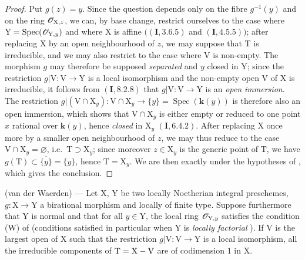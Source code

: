 \begin{proof}
Put $g(z)=y$. Since the question depends only on the fibre $g^{-1}(y)$ and on the ring $\mathscr{O}_{\mathrm{X},z}$, we can, by base change, restrict ourselves to the case where $\mathrm{Y}=\operatorname{Spec}(\mathscr{O}_{\mathrm{Y},y})$ and where $\mathrm{X}$ is affine $((\mathbf I,3.6.5)$ and $(\mathbf I,4.5.5))$; after replacing $\mathrm{X}$ by an open neighbourhood of $z$, we may suppose that $\mathrm{T}$ is irreducible, and we may also restrict to the case where $\mathrm{V}$ is non-empty.
The morphism $g$ may therefore be supposed \emph{separated} and $y$ closed in $\mathrm{Y}$; since the restriction $g|\mathrm{V}:\mathrm{V}\to\mathrm{Y}$ is a local isomorphism and the non-empty open $\mathrm{V}$ of $\mathrm{X}$ is irreducible, it follows from $(\mathbf I,8.2.8)$ that $g|\mathrm{V}:\mathrm{V}\to\mathrm{Y}$ is an \emph{open immersion}.
The restriction $g|(\mathrm{V}\cap\mathrm{X}_y):\mathrm{V}\cap\mathrm{X}_y\to\{y\}=\operatorname{Spec}(\boldsymbol{k}(y))$ is therefore also an open immersion, which shows that $\mathrm{V}\cap\mathrm{X}_y$ is either empty or reduced to one point $x$ rational
over $\boldsymbol{k}(y)$, hence \emph{closed} in $\mathrm{X}_y$ $(\mathbf I,6.4.2)$.
After replacing $\mathrm{X}$ once more by a smaller open neighbourhood of $z$, we may thus reduce to the case $\mathrm{V}\cap\mathrm{X}_y=\varnothing$, i.e.\ $\mathrm{T}\supset\mathrm{X}_y$; since moreover $z\in\mathrm{X}_y$ is the generic point of $\mathrm{T}$, we have $g(\mathrm{T})\subset\overline{\{y\}}=\{y\}$, hence $\mathrm{T}=\mathrm{X}_y$. We are then exactly under the hypotheses of , which gives the conclusion.
\end{proof}

\begin{theorem}[21.12.12]
\label{IV.21.12.12}
\textup{(van der Waerden)} ---
Let $\mathrm{X}$, $\mathrm{Y}$ be two locally Noetherian integral preschemes, $g:\mathrm{X}\to\mathrm{Y}$ a birational morphism and locally of finite type.
Suppose furthermore that $\mathrm{Y}$ is normal and that for all $y\in\mathrm{Y}$, the local ring $\mathscr{O}_{\mathrm{Y},y}$ satisfies the condition \textup{(W)} of  \textup{(conditions satisfied in particular when $\mathrm{Y}$ is \emph{locally factorial} )}.
If $\mathrm{V}$ is the largest open of $\mathrm{X}$ such that the restriction $g|\mathrm{V}:\mathrm{V}\to\mathrm{Y}$ is a local isomorphism, all the irreducible components of $\mathrm{T}=\mathrm{X}-\mathrm{V}$ are of codimension $1$ in $\mathrm{X}$.
\end{theorem}

